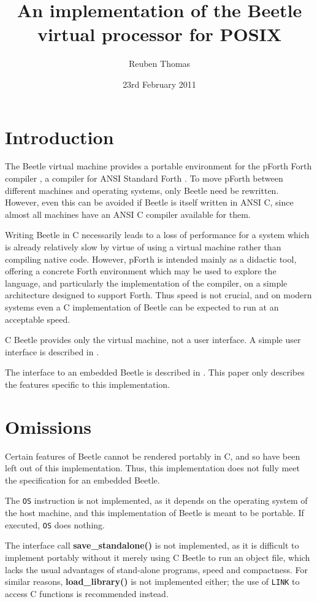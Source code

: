 \documentclass{article}
\title{An implementation of the Beetle virtual processor for POSIX}
\author{Reuben Thomas}
\date{23rd February 2011}
\begin{document}
\maketitle


\section{Introduction}

The Beetle virtual machine \cite{beetle} provides a portable environment
for the pForth Forth compiler \cite{beetledis}, a compiler for ANSI Standard
Forth \cite{ANSIforth}. To move pForth between different machines and
operating systems, only Beetle need be rewritten. However, even this can be
avoided if Beetle is itself written in ANSI C, since almost all machines have
an ANSI C compiler available for them.

Writing Beetle in C necessarily leads to a loss of performance for a system
which is already relatively slow by virtue of using a virtual machine
rather than compiling native code. However, pForth is intended mainly as a
didactic tool, offering a concrete Forth environment which may be used to
explore the language, and particularly the implementation of the compiler, on
a simple architecture designed to support Forth. Thus speed is not crucial,
and on modern systems even a C implementation of Beetle can be expected to
run at an acceptable speed.

C Beetle provides only the virtual machine, not a user interface. A simple
user interface is described in \cite{beetleuiface}.

The interface to an embedded Beetle is described in \cite{beetle}. This paper
only describes the features specific to this implementation.


\section{Omissions}
\label{omissions}

Certain features of Beetle cannot be rendered portably in C, and so have been
left out of this implementation. Thus, this implementation does not fully
meet the specification for an embedded Beetle.

The {\tt OS} instruction is not implemented, as it depends on the operating
system of the host machine, and this implementation of Beetle is meant to be
portable. If executed, {\tt OS} does nothing.

The interface call {\bf save\_standalone()} is not implemented, as it is
difficult to implement portably without it merely using C Beetle to run an
object file, which lacks the usual advantages of stand-alone programs, speed
and compactness. For similar reasons, {\bf load\_library()} is not
implemented either; the use of {\tt LINK} to access C functions is
recommended instead.
\end{document}
